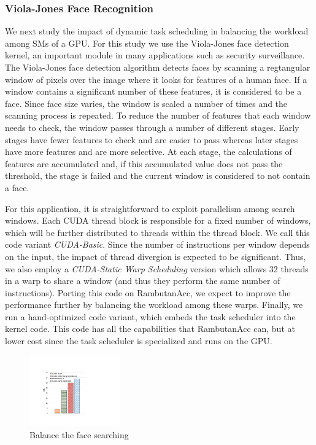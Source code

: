 \subsubsection{Viola-Jones Face Recognition}
We next study the impact of dynamic task scheduling in balancing the workload among SMs of a GPU.
For this study we use the Viola-Jones face detection kernel, an important module in many applications such as security surveillance.
The Viola-Jones face detection algorithm detects faces by scanning a regtangular window of pixels over the image where it looks for features of a human face. 
If a window contains a significant number of these features, it is considered to be a face. 
Since face size varies, the window is scaled a number of times and the scanning process is repeated. 
To reduce the number of features that each window needs to check, the window passes through a number of different stages. 
Early stages have fewer features to check and are easier to pass whereas later stages have more features and are more selective. 
At each stage, the calculations of features are accumulated and, if this accumulated value does not pass the threshold, the stage is failed and the current window is considered to not contain a face. 

For this application, it is straightforward to exploit parallelism among search windows.
Each CUDA thread block is responsible for a fixed number of windows, which will be further distributed to threads within the thread block.
We call this code variant {\em CUDA-Basic}.
Since the number of instructions per window depends on the input, the impact of thread divergion is expected to be significant.
Thus, we also employ a {\em CUDA-Static Warp Scheduling} version which allows 32 threads in a warp to share a window (and thus they perform the same number of instructions).
Porting this code on RambutanAcc, we expect to improve the performance further by balancing the workload among these warps.
Finally, we run a hand-optimized code variant, which embeds the task scheduler into the kernel code.
This code has all the capabilities that RambutanAcc can, but at lower cost since the task scheduler is specialized and runs on the GPU.

\begin{figure}[htb]
\centering
\includegraphics[width=0.35\textwidth]{figures/faceRecognition.pdf}
\caption{Balance the face searching}
\label{faceRecognition}
\end{figure}


